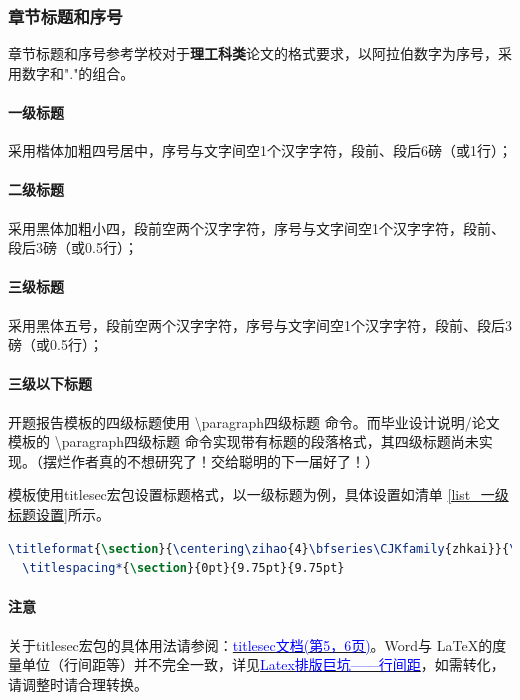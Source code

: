 \documentclass[AutoFakeBold]{ZafuThesis}
\begin{document}
\subsubsection{章节标题和序号}
章节标题和序号参考学校对于\textbf{理工科类}论文的格式要求，以阿拉伯数字为序号，采用数字和"."的组合。
\paragraph{一级标题}
采用楷体加粗四号居中，序号与文字间空1个汉字字符，段前、段后6磅（或1行）；
\paragraph{二级标题}
采用黑体加粗小四，段前空两个汉字字符，序号与文字间空1个汉字字符，段前、段后3磅（或0.5行）；
\paragraph{三级标题}
采用黑体五号，段前空两个汉字字符，序号与文字间空1个汉字字符，段前、段后3磅（或0.5行）；
\paragraph{三级以下标题}
开题报告模板的四级标题使用 \textbackslash paragraph{四级标题} 命令。而毕业设计说明/论文模板的 \textbackslash paragraph{四级标题} 命令实现带有标题的段落格式，其四级标题尚未实现。（摆烂作者真的不想研究了！交给聪明的下一届好了！）\par 
模板使用titlesec宏包设置标题格式，以一级标题为例，具体设置如清单 \ref{list_一级标题设置}所示。
\begin{lstlisting}[caption=一级标题设置, label = list_一级标题设置,language = tex]
  \titleformat{\section}{\centering\zihao{4}\bfseries\CJKfamily{zhkai}}{\thesection}{0.5em}{}
  \titlespacing*{\section}{0pt}{9.75pt}{9.75pt}
\end{lstlisting}
\paragraph{注意}
关于titlesec宏包的具体用法请参阅：\href{https://static.latexstudio.net/wp-content/uploads/2016/12/titlesec_c.pdf}{\textcolor{blue}{titlesec文档(第5，6页)}}。Word与 \LaTeX 的度量单位（行间距等）并不完全一致，详见\href{https://www.bilibili.com/video/BV1jh4y197LW/?spm_id_from=333.337.search-card.all.click&vd_source=dfa6f0143619fda15de458493344dd04}{\textcolor{blue}{Latex排版巨坑——行间距}}，如需转化，请调整时请合理转换。\par
\end{document}
